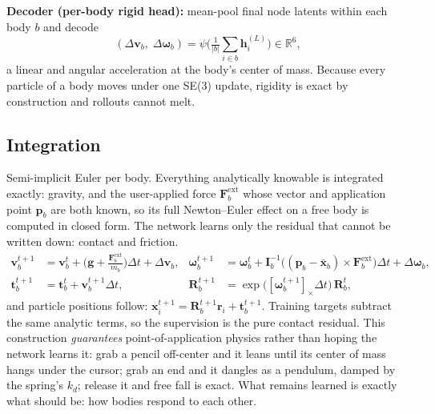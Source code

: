 \documentclass[11pt]{article}
\newcommand{\x}{\mathbf{x}}
\newcommand{\vv}{\mathbf{v}}
\newcommand{\g}{\mathbf{g}}
\newcommand{\R}{\mathbf{R}}
\newcommand{\tr}{\mathbf{t}}
\begin{document}
\textbf{Decoder (per-body rigid head):} mean-pool final node latents within each body $b$ and decode
\begin{equation}
(\Delta \vv_b,\; \Delta \boldsymbol{\omega}_b) = \psi\Big( \tfrac{1}{|b|} \textstyle\sum_{i \in b} \mathbf{h}_i^{(L)} \Big) \in \mathbb{R}^6,
\end{equation}
a linear and angular acceleration at the body's center of mass. Because every particle of a body moves under one SE(3) update, rigidity is exact by construction and rollouts cannot melt.

\subsection{Integration}
Semi-implicit Euler per body. Everything analytically knowable is integrated exactly: gravity, and the user-applied force $\mathbf{F}_b^{\text{ext}}$ whose vector and application point $\mathbf{p}_b$ are both known, so its full Newton--Euler effect on a free body is computed in closed form. The network learns only the residual that cannot be written down: contact and friction.
\begin{align}
\vv_b^{t+1} &= \vv_b^{t} + \Big(\g + \tfrac{\mathbf{F}_b^{\text{ext}}}{m_b}\Big) \Delta t + \Delta \vv_b, &
\boldsymbol{\omega}_b^{t+1} &= \boldsymbol{\omega}_b^{t} + \mathbf{I}_b^{-1}\big((\mathbf{p}_b - \bar{\x}_b) \times \mathbf{F}_b^{\text{ext}}\big) \Delta t + \Delta \boldsymbol{\omega}_b, \\
\tr_b^{t+1} &= \tr_b^{t} + \vv_b^{t+1} \Delta t, &
\R_b^{t+1} &= \exp\!\big([\boldsymbol{\omega}_b^{t+1}]_\times \Delta t\big)\, \R_b^{t},
\end{align}
and particle positions follow: $\x_i^{t+1} = \R_b^{t+1} \mathbf{r}_i + \tr_b^{t+1}$. Training targets subtract the same analytic terms, so the supervision is the pure contact residual. This construction \emph{guarantees} point-of-application physics rather than hoping the network learns it: grab a pencil off-center and it leans until its center of mass hangs under the cursor; grab an end and it dangles as a pendulum, damped by the spring's $k_d$; release it and free fall is exact. What remains learned is exactly what should be: how bodies respond to each other.
\end{document}

